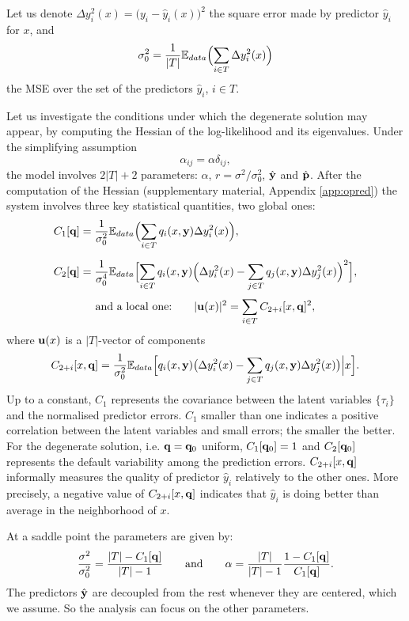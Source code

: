 Let us denote $\Delta y_i^2(x)= \bigl(y_i-\hat y_i(x)\bigr)^2$ the square error made by predictor $\hat y_i$ for $x$, and 
\[
\sigma_0^2 = \frac{1}{|T|}{\mathbb E}_{data}\Bigl(\sum_{i \in T } \Delta y_i^2(x)\Bigr)
\]
the  MSE over the set of the predictors $\hat y_i$, $i \in T$. 

Let us investigate the conditions under which the degenerate solution may appear, by computing the Hessian of the log-likelihood and its eigenvalues. Under the simplifying assumption
\[
\alpha_{ij} = \alpha \delta_{ij},
\]
the model involves $2\vert T\vert+2$ parameters: $\alpha$, $r = \sigma^2/\sigma_0^2$, $\hat {\bf y}$ and $\hat{\bf p}$. After the computation of the Hessian (supplementary material, Appendix \ref{app:opred}) the system involves three key statistical quantities, two global ones:
\begin{align}
C_1[{\bf q}] &= \frac{1}{\sigma_0^2}{\mathbb E}_{data}\Bigl(\sum_{i \in T} q_i(x,{\bf y})\Delta y_i^2(x)\Bigr),\label{def:C1}\\[0.2cm]
C_2[{\bf q}] &= \frac{1}{\sigma_0^4}{\mathbb E}_{data}\Bigl[\sum_{i\in T}q_i(x,{\bf y})\Bigl(\Delta y_i^2(x)-\sum_{j \in T} q_j(x,{\bf y})\Delta y_j^2(x)\Bigr)^2\Bigr],\label{def:C2}
\end{align}
\[
\text{and a local one:}\qquad \vert {\bf u}(x)\vert^2 = \sum_{i\in T} C_{2+i}[x,{\bf q}]^2,
\]
where ${\bf u}(x)$ is a $\vert T\vert$-vector of components 
\[
C_{2+i}[x,{\bf q}] = \frac{1}{\sigma_0^2}{\mathbb E}_{data}
\Bigl[ q_i(x,{\bf y})\bigl(\Delta y_i^2(x)-\sum_{j \in T} q_j(x,{\bf y})\Delta y_j^2(x)\bigr)\Big\vert x \Bigr].
\]
Up to a constant, $C_1$ represents the covariance between the latent variables $\{\tau_i\}$ and the normalised 
predictor errors. $C_1$ smaller than one indicates a positive correlation between the latent variables and small 
errors; the smaller the better. For the degenerate solution, i.e. ${\bf q}={\bf q}_{0}$ uniform, $C_1[{\bf q}_{0}]=1$ and $C_2[{\bf q}_{0}]$
represents the default variability among the prediction errors. $C_{2+i}[x,{\bf q}]$ informally measures the quality of 
predictor $\hat y_i$ relatively to the other ones. More precisely, a negative value of  $C_{2+i}[x,{\bf q}]$ indicates 
that $\hat y_i$ is doing better than average in the neighborhood of $x$.  

At a saddle point the parameters are given by:
\[
\frac{\sigma^2}{\sigma_0^2} = \frac{\vert T\vert-C_1[{\bf q}]}{\vert T\vert-1} \qquad\text{and}\qquad
\alpha = \frac{\vert T\vert}{\vert T\vert-1}\frac{1-C_1[{\bf q}]}{C_1[{\bf q}]}.
\]
The predictors $\hat {\bf y}$ are decoupled from  the rest whenever they are centered, which we assume. So the analysis can focus on the other parameters. 
